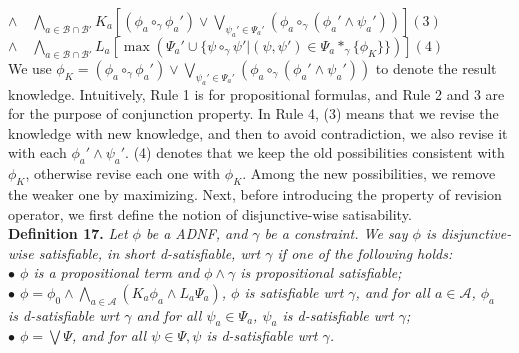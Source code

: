 \documentclass{llncs}
\begin{document}
{\hspace*{0.1in}\hspace{0.75in} $\land\quad
   \bigwedge_{a\in\mathcal{B}\cap\mathcal{B}'}K_a[(\phi_a\circ_\gamma\phi_a')\lor
   \bigvee_{\psi_a'\in\Psi_a'}(\phi_a\circ_\gamma(\phi_a'\land\psi_a'))]$\hspace{0.5in}$(3)$\\
\hspace*{0.1in}\hspace{0.75in} $\land \quad \bigwedge_{a\in\mathcal{B}\cap\mathcal{B}'}L_a[\max{(\Psi_a'\cup\{\psi\circ_\gamma\psi'|(\psi,\psi')\in\Psi_a*_\gamma\{ \phi_K\}\})}]$\hspace{0.15in}$(4)$}\vspace{0.05in}\\
We use $\phi_K = (\phi_a\circ_\gamma\phi_a')\lor\bigvee_{\psi_a'\in\Psi_a'}(\phi_a\circ_\gamma(\phi_a'\land\psi_a'))$ to denote the result knowledge. Intuitively, Rule 1 is for propositional formulas, and Rule 2 and 3 are for the purpose of conjunction property. In Rule 4, (3) means that we revise the knowledge with new knowledge, and then to avoid contradiction, we also revise it with each $\phi_a'\land\psi_a'$. (4) denotes that we keep the old possibilities consistent with $\phi_K$, otherwise revise each one with $\phi_K$. Among the new possibilities, we remove the weaker one by maximizing. Next, before introducing the property of revision operator, we first define the notion of disjunctive-wise satisability.\vspace{0.05in}\\
\textbf{Definition 17.} \textit{Let $\phi$ be a ADNF, and $\gamma$ be a constraint. We say $\phi$ is disjunctive-wise satisfiable, in short d-satisfiable, wrt $\gamma$ if one of the following holds:\\
\hspace*{0.1in}$\bullet$ $\phi$ is a propositional term and $\phi\land\gamma$ is propositional satisfiable;\\
\hspace*{0.1in}$\bullet$ $\phi=\phi_0\land\bigwedge_{a\in\mathcal{A}}(K_a\phi_a\land L_a\Psi_a)$, $\phi$ is satisfiable wrt $\gamma$, and for all $a\in\mathcal{A}$, $\phi_a$ \\
\hspace*{0.1in}\hspace{0.1in} is d-satisfiable wrt $\gamma$ and for all $\psi_a\in\Psi_a$, $\psi_a$ is d-satisfiable wrt $\gamma$;\\
\hspace*{0.1in}$\bullet$ $\phi=\bigvee\Psi$, and for all $\psi\in\Psi, \psi$ is d-satisfiable wrt $\gamma$.}\vspace{0.05in}
\end{document}
